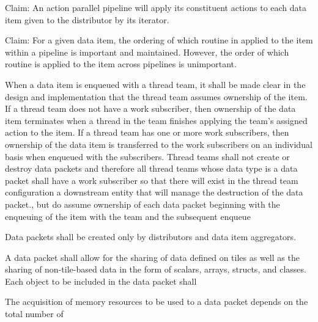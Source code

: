 \documentclass{article}
\begin{document}
Claim: An action parallel pipeline will apply its constituent actions to each
data item given to the distributor by its iterator.

Claim: For a given data item, the ordering of which routine in applied to the
item within a pipeline is important and maintained.  However, the order of which
routine is applied to the item across pipelines is unimportant.

\begin{spec}
When a data item is enqueued with a thread team, it shall be made clear in the
design and implementation that the thread team assumes ownership of the item.
If a thread team does not have a work subscriber, then ownership of the data
item terminates when a thread in the team finishes applying the team's assigned
action to the item.  If a thread team has one or more work subscribers, then
ownership of the data item is transferred to the work subscribers on an
individual basis when enqueued with the subscribers.  Thread teams shall not
create or destroy data packets and therefore all thread teams whose data type is
a data packet shall have a work subscriber so that there will exist in the
thread team configuration a downstream entity that will manage the destruction
of the data packet., but do assume ownership of each data packet beginning with
the enqueuing of the item with the team and the subsequent enqueue
\end{spec}
Data packets shall be created only by distributors and data item aggregators.

\begin{spec}
A data packet shall allow for the sharing of data defined on tiles as well as the
sharing of non-tile-based data in the form of scalars, arrays, structs, and classes.
Each object to be included in the data packet shall
\end{spec}

\begin{spec}
The acquisition of memory resources to be used to a data packet depends on the
total number of
\end{spec}
\end{document}
